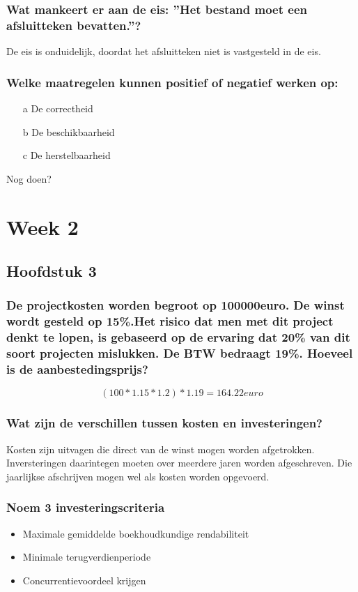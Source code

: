 \documentclass[a4paper,titlepage]{artikel1}
\begin{document}
   
   \subsubsection[Opdracht 9]{Wat mankeert er aan de eis: ''Het bestand moet een afsluitteken bevatten.''?}
   De eis is onduidelijk, doordat het afsluitteken niet is vastgesteld in de eis. 
   
   \subsubsection[Opdracht 10]{Welke maatregelen kunnen positief of negatief werken op:}
   \begin{itemize}
    \item[a] De correctheid
    \item[b] De beschikbaarheid
    \item[c] De herstelbaarheid
   \end{itemize}
   Nog doen?
   
 \section{Week 2}
  \subsection{Hoofdstuk 3}
   \subsubsection[Opdracht 1]{De projectkosten worden begroot op
   100000euro. De winst wordt gesteld op 15\%.Het risico dat men met dit
   project denkt te lopen, is gebaseerd op de ervaring dat 20\% van dit
   soort projecten mislukken. De BTW bedraagt 19\%. Hoeveel is de
   aanbestedingsprijs?}
   \begin{displaymath}
    (100*1.15*1.2)*1.19={164.22}euro
   \end{displaymath}
   
   \subsubsection[Opdracht 2]{Wat zijn de verschillen tussen kosten en investeringen?}
   Kosten zijn uitvagen die direct van de winst mogen worden afgetrokken. Inversteringen daarintegen moeten over meerdere jaren worden afgeschreven. Die jaarlijkse afschrijven mogen wel als kosten worden opgevoerd.
   
   \subsubsection[Opdracht 3]{Noem 3 investeringscriteria}
   \begin{itemize}
    \item Maximale gemiddelde boekhoudkundige rendabiliteit
    \item Minimale terugverdienperiode
    \item Concurrentievoordeel krijgen
   \end{itemize}
\end{document}
